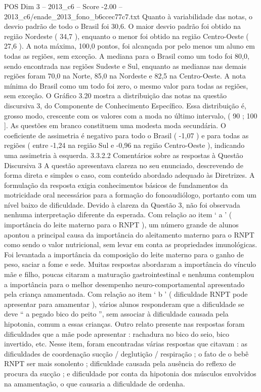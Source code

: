 \begin{textsample}{POS Dim 3 – 2013\_c6 – Score -2.00 – 2013\_c6/enade\_2013\_fono\_b6ccec77c7.txt}
Quanto à variabilidade das notas, o desvio padrão de todo o Brasil foi 30,6.
O maior desvio padrão foi obtido na região Nordeste ( 34,7 ), enquanto o menor foi obtido na região Centro-Oeste ( 27,6 ).
A nota máxima, 100,0 pontos, foi alcançada por pelo menos um aluno em todas as regiões, sem exceção.
A mediana para o Brasil como um todo foi 80,0, sendo encontrada nas regiões Sudeste e Sul, enquanto as medianas nas demais regiões foram 70,0 na Norte, 85,0 na Nordeste e 82,5 na Centro-Oeste.
A nota mínima do Brasil como um todo foi zero, o mesmo valor para todas as regiões, sem exceção.
O Gráfico 3.20 mostra a distribuição das notas na questão discursiva 3, do Componente de Conhecimento Específico.
Essa distribuição é, grosso modo, crescente com os valores com a moda no último intervalo, ( 90 ; 100 ].
As questões em branco constituem uma modesta moda secundária.
O coeficiente de assimetria é negativo para todo o Brasil ( -1,07 ) e para todas as regiões ( entre -1,24 na região Sul e -0,96 na região Centro-Oeste ), indicando uma assimetria à esquerda. 3.3.2.2 Comentários sobre as respostas à Questão Discursiva 3 A questão apresentava clareza no seu enunciado, descrevendo de forma direta e simples o caso, com conteúdo abordado adequado às Diretrizes.
A formulação da resposta exigia conhecimentos básicos de fundamentos da motricidade oral necessários para a formação do fonoaudiólogo, portanto com um nível baixo de dificuldade.
Devido à clareza da Questão 3, não foi observada nenhuma interpretação diferente da esperada.
Com relação ao item ‘ a ’ ( importância do leite materno para o RNPT ), um número grande de alunos apontou a principal causa da importância do aleitamento materno para o RNPT como sendo o valor nutricional, sem levar em conta as propriedades imunológicas.
Foi levantada a importância da composição do leite materno para o ganho de peso, saciar a fome e sede.
Muitas respostas abordaram a importância do vínculo mãe e filho, poucas citaram a maturação gastrointestinal e nenhuma contemplou a importância para o melhor desempenho neuro-comportamental apresentado pela criança amamentada.
Com relação ao item ‘ b ’ ( dificuldade RNPT pode apresentar para amamentar ), vários alunos responderam que a dificuldade se deve “ a pegado bico do peito ”, sem associar à dificuldade causada pela hipotonia, comum a essas crianças.
Outro relato presente nas respostas foram dificuldades que a mãe pode apresentar : rachadura no bico do seio, bico invertido, etc.
Nesse item, foram encontradas várias respostas que citavam : as dificuldades de coordenação sucção / deglutição / respiração ; o fato de o bebê RNPT ser mais sonolento ; dificuldade causada pela ausência do reflexo de procura da sucção ; e dificuldade por conta da hipotonia dos músculos envolvidos na amamentação, o que causaria a dificuldade de ordenha.

\end{textsample}
